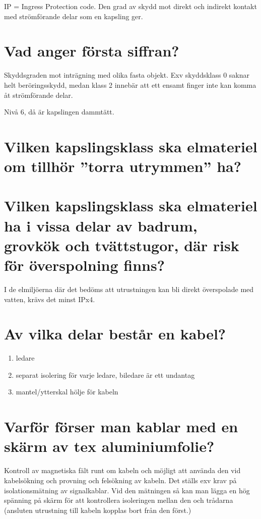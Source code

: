 \documentclass[a4paper,swedish]{article}
\begin{document}
IP = Ingress Protection code.
Den grad av skydd mot direkt och indirekt kontakt med strömförande delar som en kapsling ger.

\setcounter{section}{4}
\section{Vad anger första siffran?}

Skyddsgraden mot inträgning med olika fasta objekt. Exv skyddsklass 0 saknar helt beröringsskydd,
medan klass 2 innebär att ett ensamt finger inte kan komma åt strömförande delar.

Nivå 6, då är kapslingen dammtätt.

\setcounter{section}{6}
\section{Vilken kapslingsklass ska elmateriel om tillhör ”torra utrymmen” ha?}


\setcounter{section}{8}
\section{Vilken kapslingsklass ska elmateriel ha i vissa delar av badrum, grovkök och
  tvättstugor, där risk för överspolning finns?}

I de elmiljöerna där det bedöms att utrustningen kan bli direkt överspolade med vatten, krävs det minst IPx4.

\setcounter{section}{10}
\section{Av vilka delar består en kabel?}

\begin{enumerate}
\item ledare
\item separat isolering för varje ledare, biledare är ett undantag
\item mantel/ytterskal hölje för kabeln
\end{enumerate}

\setcounter{section}{12}
\section{Varför förser man kablar med en skärm av tex aluminiumfolie?}

Kontroll av magnetiska fält runt om kabeln och möjligt att använda den vid kabelsökning
och provning och felsökning av kabeln. Det ställs exv krav på isolationsmätning av signalkablar.
Vid den mätningen så kan man lägga en hög spänning på skärm för att kontrollera isoleringen
mellan den och trådarna (ansluten utrustning till kabeln kopplas bort från den först.)
\end{document}

